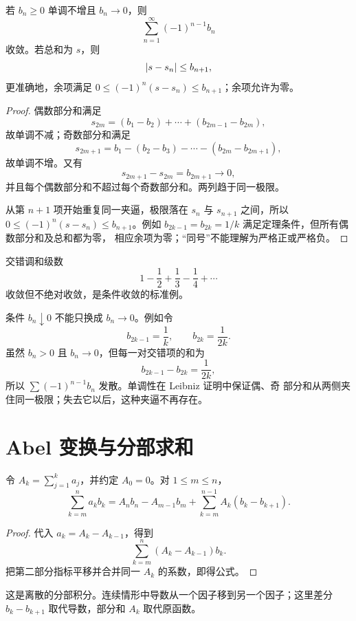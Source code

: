 \begin{theorem}[Leibniz 判别]
\label{thm:leibniz-alternating}
若 \(b_n\ge0\) 单调不增且 \(b_n\to0\)，则
\[
 \sum_{n=1}^\infty(-1)^{n-1}b_n
\]
收敛。若总和为 \(s\)，则
\[
 \left|s-s_n\right|\le b_{n+1},
\]
更准确地，余项满足 \(0\le(-1)^n(s-s_n)\le b_{n+1}\)；余项允许为零。
\end{theorem}

\begin{proof}
偶数部分和满足
\[
 s_{2m}=(b_1-b_2)+\cdots+(b_{2m-1}-b_{2m}),
\]
故单调不减；奇数部分和满足
\[
 s_{2m+1}=b_1-(b_2-b_3)-\cdots-(b_{2m}-b_{2m+1}),
\]
故单调不增。又有
\[
 s_{2m+1}-s_{2m}=b_{2m+1}\to0,
\]
并且每个偶数部分和不超过每个奇数部分和。两列趋于同一极限。

从第 \(n+1\) 项开始重复同一夹逼，极限落在 \(s_n\) 与
\(s_{n+1}\) 之间，所以 \(0\le(-1)^n(s-s_n)\le b_{n+1}\)。例如
\(b_{2k-1}=b_{2k}=1/k\) 满足定理条件，但所有偶数部分和及总和都为零，
相应余项为零；“同号”不能理解为严格正或严格负。
\end{proof}

\begin{example}
交错调和级数
\[
 1-\frac12+\frac13-\frac14+\cdots
\]
收敛但不绝对收敛，是条件收敛的标准例。
\end{example}

条件 \(b_n\downarrow0\) 不能只换成 \(b_n\to0\)。例如令
\[
 b_{2k-1}=\frac1k,\qquad b_{2k}=\frac1{2k}.
\]
虽然 \(b_n>0\) 且 \(b_n\to0\)，但每一对交错项的和为
\[
 b_{2k-1}-b_{2k}=\frac1{2k},
\]
所以 \(\sum(-1)^{n-1}b_n\) 发散。单调性在 Leibniz 证明中保证偶、奇
部分和从两侧夹住同一极限；失去它以后，这种夹逼不再存在。

\section{Abel 变换与分部求和}

\begin{theorem}[Abel 变换]
\label{thm:abel-summation}
令 \(A_k=\sum_{j=1}^k a_j\)，并约定 \(A_0=0\)。对
\(1\le m\le n\)，
\[
 \sum_{k=m}^n a_kb_k
 =A_nb_n-A_{m-1}b_m
  +\sum_{k=m}^{n-1}A_k(b_k-b_{k+1}).
\]
\end{theorem}

\begin{proof}
代入 \(a_k=A_k-A_{k-1}\)，得到
\[
 \sum_{k=m}^n(A_k-A_{k-1})b_k.
\]
把第二部分指标平移并合并同一 \(A_k\) 的系数，即得公式。
\end{proof}

这是离散的分部积分。连续情形中导数从一个因子移到另一个因子；这里差分
\(b_k-b_{k+1}\) 取代导数，部分和 \(A_k\) 取代原函数。

